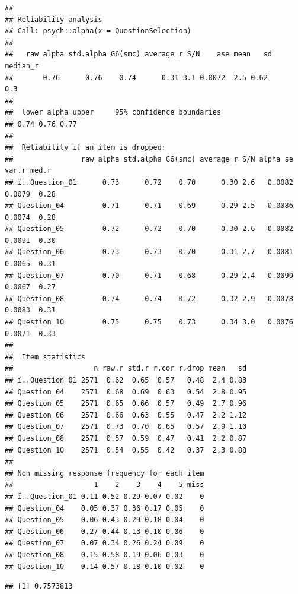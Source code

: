 \documentclass[
]{book}
\newenvironment{Shaded}{\begin{snugshade}}{\end{snugshade}}
\newcommand{\NormalTok}[1]{#1}
\newcommand{\OperatorTok}[1]{\textcolor[rgb]{0.81,0.36,0.00}{\textbf{#1}}}
\begin{document}
\begin{verbatim}
## 
## Reliability analysis   
## Call: psych::alpha(x = QuestionSelection)
## 
##   raw_alpha std.alpha G6(smc) average_r S/N    ase mean   sd median_r
##       0.76      0.76    0.74      0.31 3.1 0.0072  2.5 0.62      0.3
## 
##  lower alpha upper     95% confidence boundaries
## 0.74 0.76 0.77 
## 
##  Reliability if an item is dropped:
##                raw_alpha std.alpha G6(smc) average_r S/N alpha se  var.r med.r
## ï..Question_01      0.73      0.72    0.70      0.30 2.6   0.0082 0.0079  0.28
## Question_04         0.71      0.71    0.69      0.29 2.5   0.0086 0.0074  0.28
## Question_05         0.72      0.72    0.70      0.30 2.6   0.0082 0.0091  0.30
## Question_06         0.73      0.73    0.70      0.31 2.7   0.0081 0.0065  0.31
## Question_07         0.70      0.71    0.68      0.29 2.4   0.0090 0.0067  0.27
## Question_08         0.74      0.74    0.72      0.32 2.9   0.0078 0.0083  0.31
## Question_10         0.75      0.75    0.73      0.34 3.0   0.0076 0.0071  0.33
## 
##  Item statistics 
##                   n raw.r std.r r.cor r.drop mean   sd
## ï..Question_01 2571  0.62  0.65  0.57   0.48  2.4 0.83
## Question_04    2571  0.68  0.69  0.63   0.54  2.8 0.95
## Question_05    2571  0.65  0.66  0.57   0.49  2.7 0.96
## Question_06    2571  0.66  0.63  0.55   0.47  2.2 1.12
## Question_07    2571  0.73  0.70  0.65   0.57  2.9 1.10
## Question_08    2571  0.57  0.59  0.47   0.41  2.2 0.87
## Question_10    2571  0.54  0.55  0.42   0.37  2.3 0.88
## 
## Non missing response frequency for each item
##                   1    2    3    4    5 miss
## ï..Question_01 0.11 0.52 0.29 0.07 0.02    0
## Question_04    0.05 0.37 0.36 0.17 0.05    0
## Question_05    0.06 0.43 0.29 0.18 0.04    0
## Question_06    0.27 0.44 0.13 0.10 0.06    0
## Question_07    0.07 0.34 0.26 0.24 0.09    0
## Question_08    0.15 0.58 0.19 0.06 0.03    0
## Question_10    0.14 0.57 0.18 0.10 0.02    0
\end{verbatim}

\begin{Shaded}
\end{Shaded}

\begin{verbatim}
## [1] 0.7573813
\end{verbatim}
\end{document}
